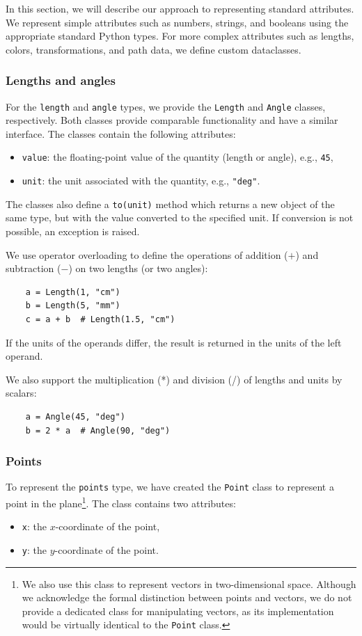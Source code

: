 In this section, we will describe our approach to representing standard attributes. We represent simple attributes such as numbers, strings, and booleans using the appropriate standard Python types. For more complex attributes such as lengths, colors, transformations, and path data, we define custom dataclasses.

\subsubsection{Lengths and angles}

For the \texttt{length} and \texttt{angle} types, we provide the \texttt{Length} and \texttt{Angle} classes, respectively. Both classes provide comparable functionality and have a similar interface. The classes contain the following attributes:
\begin{itemize}
    \item \texttt{value}: the floating-point value of the quantity (length or angle), e.g., \texttt{45},
    \item \texttt{unit}: the unit associated with the quantity, e.g., \texttt{"deg"}.
\end{itemize}

The classes also define a \texttt{to(unit)} method which returns a new object of the same type, but with the value converted to the specified unit. If conversion is not possible, an exception is raised.

We use operator overloading to define the operations of addition ($+$) and subtraction ($-$) on two lengths (or two angles):
\begin{verbatim}
    a = Length(1, "cm")
    b = Length(5, "mm")
    c = a + b  # Length(1.5, "cm")
\end{verbatim}

If the units of the operands differ, the result is returned in the units of the left operand.

We also support the multiplication (*) and division (/) of lengths and units by scalars:
\begin{verbatim}
    a = Angle(45, "deg")
    b = 2 * a  # Angle(90, "deg")
\end{verbatim}

\subsubsection{Points}

To represent the \texttt{points} type, we have created the \texttt{Point} class to represent a point in the plane\footnote{We also use this class to represent vectors in two-dimensional space. Although we acknowledge the formal distinction between points and vectors, we do not provide a dedicated class for manipulating vectors, as its implementation would be virtually identical to the \texttt{Point} class.}. The class contains two attributes:
\begin{itemize}
    \item \texttt{x}: the $x$-coordinate of the point,
    \item \texttt{y}: the $y$-coordinate of the point.
\end{itemize}

